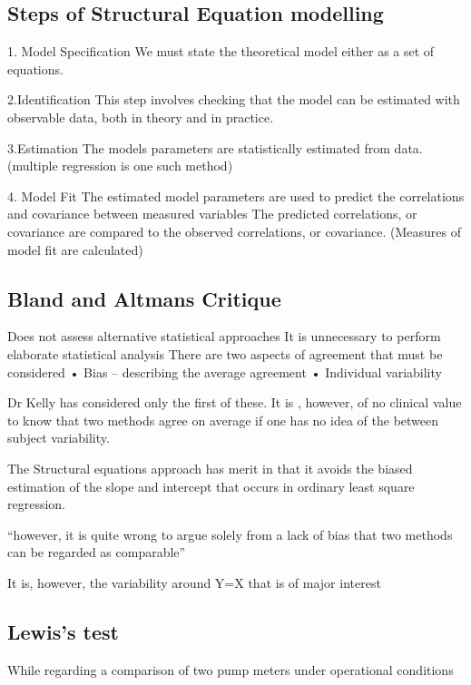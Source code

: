 \subsection{Steps of Structural Equation modelling}

1. Model Specification
We must state the theoretical model either as a set of equations.

2.Identification 
This step involves checking that the model can be estimated with observable data, both in theory and in practice.

3.Estimation
The models parameters are statistically estimated from data. (multiple regression is one such method)

4. Model Fit
The estimated model parameters are used to predict the correlations and covariance between measured variables 
The predicted correlations, or covariance are compared to the observed correlations, or covariance. (Measures of model fit are calculated)

\subsection{Bland and Altmans Critique}

Does not assess alternative statistical approaches
It is unnecessary to perform elaborate statistical analysis
There are two aspects of agreement that must be considered
•	Bias – describing the average agreement
•	Individual variability


Dr Kelly has considered only the first of these.
It is , however, of no clinical value to know that two methods agree on average if one has no idea of the between subject variability.

The Structural equations approach has merit in that it avoids the biased estimation of the slope and intercept that occurs in ordinary least square regression.

“however, it is quite wrong to argue solely from a lack of bias that two methods can be regarded as comparable”

It is, however, the variability around Y=X that is of major interest



\subsection{Lewis’s test} 
While regarding a comparison of two pump meters under operational conditions

